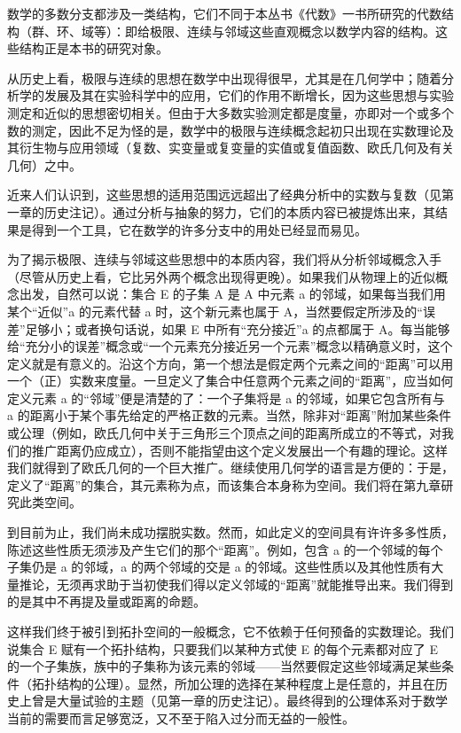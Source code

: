 
数学的多数分支都涉及一类结构，它们不同于本丛书《代数》一书所研究的代数结构（群、环、域等）：即给极限、连续与邻域这些直观概念以数学内容的结构。这些结构正是本书的研究对象。

从历史上看，极限与连续的思想在数学中出现得很早，尤其是在几何学中；随着分析学的发展及其在实验科学中的应用，它们的作用不断增长，因为这些思想与实验测定和近似的思想密切相关。但由于大多数实验测定都是度量，亦即对一个或多个数的测定，因此不足为怪的是，数学中的极限与连续概念起初只出现在实数理论及其衍生物与应用领域（复数、实变量或复变量的实值或复值函数、欧氏几何及有关几何）之中。

近来人们认识到，这些思想的适用范围远远超出了经典分析中的实数与复数（见第一章的历史注记）。通过分析与抽象的努力，它们的本质内容已被提炼出来，其结果是得到一个工具，它在数学的许多分支中的用处已经显而易见。

为了揭示极限、连续与邻域这些思想中的本质内容，我们将从分析邻域概念入手（尽管从历史上看，它比另外两个概念出现得更晚）。如果我们从物理上的近似概念出发，自然可以说：集合 E 的子集 A 是 A 中元素 a 的邻域，如果每当我们用某个“近似”a 的元素代替 a 时，这个新元素也属于 A，当然要假定所涉及的“误差”足够小；或者换句话说，如果 E 中所有“充分接近”a 的点都属于 A。每当能够给“充分小的误差”概念或“一个元素充分接近另一个元素”概念以精确意义时，这个定义就是有意义的。沿这个方向，第一个想法是假定两个元素之间的“距离”可以用一个（正）实数来度量。一旦定义了集合中任意两个元素之间的“距离”，应当如何定义元素 a 的“邻域”便是清楚的了：一个子集将是 a 的邻域，如果它包含所有与 a 的距离小于某个事先给定的严格正数的元素。当然，除非对“距离”附加某些条件或公理（例如，欧氏几何中关于三角形三个顶点之间的距离所成立的不等式，对我们的推广距离仍应成立），否则不能指望由这个定义发展出一个有趣的理论。这样我们就得到了欧氏几何的一个巨大推广。继续使用几何学的语言是方便的：于是，定义了“距离”的集合，其元素称为点，而该集合本身称为空间。我们将在第九章研究此类空间。

到目前为止，我们尚未成功摆脱实数。然而，如此定义的空间具有许许多多性质，陈述这些性质无须涉及产生它们的那个“距离”。例如，包含 a 的一个邻域的每个子集仍是 a 的邻域，a 的两个邻域的交是 a 的邻域。这些性质以及其他性质有大量推论，无须再求助于当初使我们得以定义邻域的“距离”就能推导出来。我们得到的是其中不再提及量或距离的命题。

这样我们终于被引到拓扑空间的一般概念，它不依赖于任何预备的实数理论。我们说集合 E 赋有一个拓扑结构，只要我们以某种方式使 E 的每个元素都对应了 E 的一个子集族，族中的子集称为该元素的邻域——当然要假定这些邻域满足某些条件（拓扑结构的公理）。显然，所加公理的选择在某种程度上是任意的，并且在历史上曾是大量试验的主题（见第一章的历史注记）。最终得到的公理体系对于数学当前的需要而言足够宽泛，又不至于陷入过分而无益的一般性。

